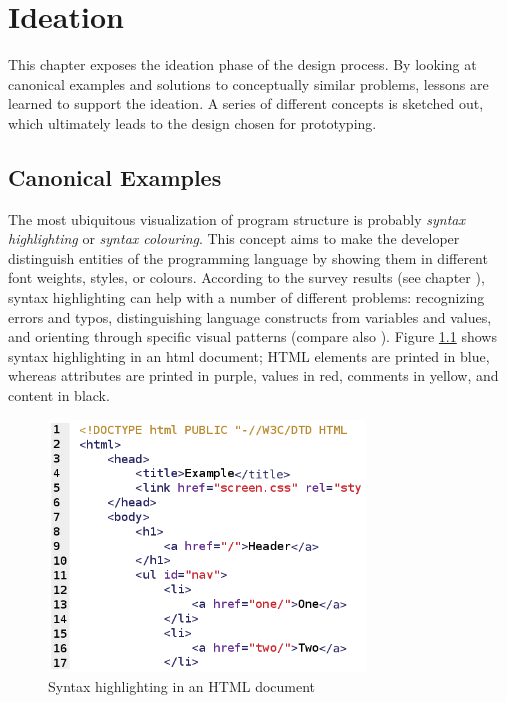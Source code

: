 \chapter{Ideation}\label{ideation}

This chapter exposes the ideation phase of the design process. By
looking at canonical examples and solutions to conceptually similar
problems, lessons are learned to support the ideation. A series of
different concepts is sketched out, which ultimately leads to the design
chosen for prototyping.

\section{Canonical Examples}\label{similar}

The most ubiquitous visualization of program structure is probably
\emph{syntax highlighting} or \emph{syntax colouring}. This concept aims
to make the developer distinguish entities of the programming language
by showing them in different font weights, styles, or colours. According
to the survey results (see chapter ), syntax
highlighting can help with a number of different problems: recognizing
errors and typos, distinguishing language constructs from variables and
values, and orienting through specific visual patterns (compare also
). Figure \ref{fig:syntaxhighlighting} shows syntax
highlighting in an \ac{html} document; HTML elements are printed in
blue, whereas attributes are printed in purple, values in red, comments
in yellow, and content in black.

\begin{figure}[htbp]
\centering
\includegraphics[keepaspectratio,width=0.75\textwidth]{img/syntax_highlighting.png}
\caption{Syntax highlighting in an HTML document}
\label{fig:syntaxhighlighting}
\end{figure}

